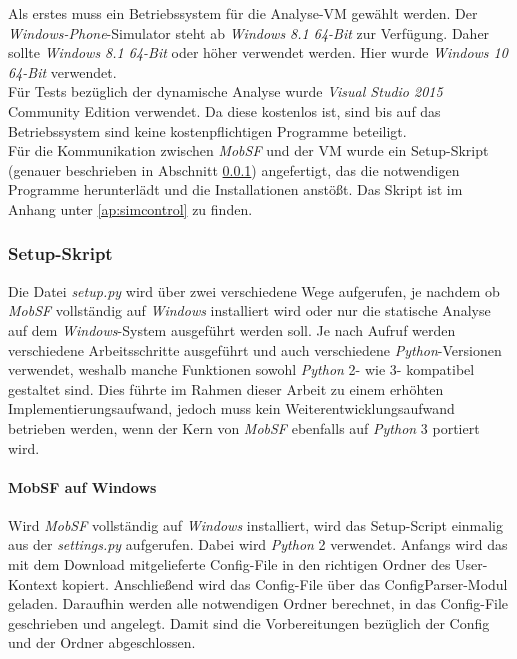 Als erstes muss ein Betriebssystem für die Analyse-VM gewählt werden. Der \textit{Windows-Phone}-Simulator steht ab \textit{Windows 8.1 64-Bit} zur Verfügung. Daher sollte \textit{Windows 8.1 64-Bit} oder höher verwendet werden. Hier wurde \textit{Windows 10 64-Bit} verwendet.\\

Für Tests bezüglich der dynamische Analyse wurde \textit{Visual Studio 2015} Community Edition verwendet. Da diese kostenlos ist, sind bis auf das Betriebssystem sind keine kostenpflichtigen Programme beteiligt.\\

Für die Kommunikation zwischen \textit{MobSF} und der VM wurde ein Setup-Skript (genauer beschrieben in Abschnitt \ref{ref:WeitMobSFWindSetup}) angefertigt, das die notwendigen Programme herunterlädt und die Installationen anstößt. Das Skript ist im Anhang unter \ref{ap:simcontrol} zu finden.

\subsubsection{Setup-Skript}\label{ref:WeitMobSFWindSetup}
Die Datei \textit{setup.py} wird über zwei verschiedene Wege aufgerufen, je nachdem ob \textit{MobSF} vollständig auf \textit{Windows} installiert wird oder nur die statische Analyse auf dem \textit{Windows}-System ausgeführt werden soll. Je nach Aufruf werden verschiedene Arbeitsschritte ausgeführt und auch verschiedene \textit{Python}-Versionen verwendet, weshalb manche Funktionen sowohl \textit{Python} 2- wie 3- kompatibel gestaltet sind. Dies führte im Rahmen dieser Arbeit zu einem erhöhten Implementierungsaufwand, jedoch muss kein Weiterentwicklungsaufwand betrieben werden, wenn der Kern von \textit{MobSF} ebenfalls auf \textit{Python} 3 portiert wird.

\paragraph{MobSF auf Windows}
Wird \textit{MobSF} vollständig auf \textit{Windows} installiert, wird das Setup-Script einmalig aus der \textit{settings.py} aufgerufen. Dabei wird \textit{Python} 2 verwendet. Anfangs wird das mit dem Download mitgelieferte Config-File in den richtigen Ordner des User-Kontext kopiert. Anschließend wird das Config-File über das ConfigParser-Modul geladen. Daraufhin werden alle notwendigen Ordner berechnet, in das Config-File geschrieben und angelegt. Damit sind die Vorbereitungen bezüglich der Config und der Ordner abgeschlossen.\\

